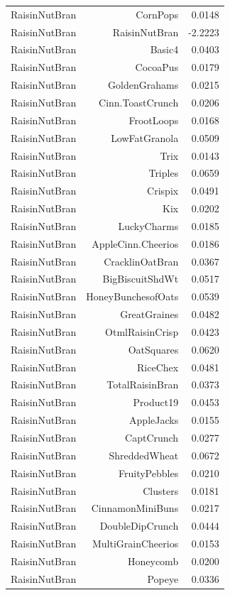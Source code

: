 \begin{longtable}{@{}lrr@{}}
RaisinNutBran & CornPops & 0.0148 \\
RaisinNutBran & RaisinNutBran & -2.2223 \\
RaisinNutBran & Basic4 & 0.0403 \\
RaisinNutBran & CocoaPus & 0.0179 \\
RaisinNutBran & GoldenGrahams & 0.0215 \\
RaisinNutBran & Cinn.ToastCrunch & 0.0206 \\
RaisinNutBran & FrootLoops & 0.0168 \\
RaisinNutBran & LowFatGranola & 0.0509 \\
RaisinNutBran & Trix & 0.0143 \\
RaisinNutBran & Triples & 0.0659 \\
RaisinNutBran & Crispix & 0.0491 \\
RaisinNutBran & Kix & 0.0202 \\
RaisinNutBran & LuckyCharms & 0.0185 \\
RaisinNutBran & AppleCinn.Cheerios & 0.0186 \\
RaisinNutBran & CracklinOatBran & 0.0367 \\
RaisinNutBran & BigBiscuitShdWt & 0.0517 \\
RaisinNutBran & HoneyBunchesofOats & 0.0539 \\
RaisinNutBran & GreatGraines & 0.0482 \\
RaisinNutBran & OtmlRaisinCrisp & 0.0423 \\
RaisinNutBran & OatSquares & 0.0620 \\
RaisinNutBran & RiceChex & 0.0481 \\
RaisinNutBran & TotalRaisinBran & 0.0373 \\
RaisinNutBran & Product19 & 0.0453 \\
RaisinNutBran & AppleJacks & 0.0155 \\
RaisinNutBran & CaptCrunch & 0.0277 \\
RaisinNutBran & ShreddedWheat & 0.0672 \\
RaisinNutBran & FruityPebbles & 0.0210 \\
RaisinNutBran & Clusters & 0.0181 \\
RaisinNutBran & CinnamonMiniBuns & 0.0217 \\
RaisinNutBran & DoubleDipCrunch & 0.0444 \\
RaisinNutBran & MultiGrainCheerios & 0.0153 \\
RaisinNutBran & Honeycomb & 0.0200 \\
RaisinNutBran & Popeye & 0.0336 \\

\end{longtable}
